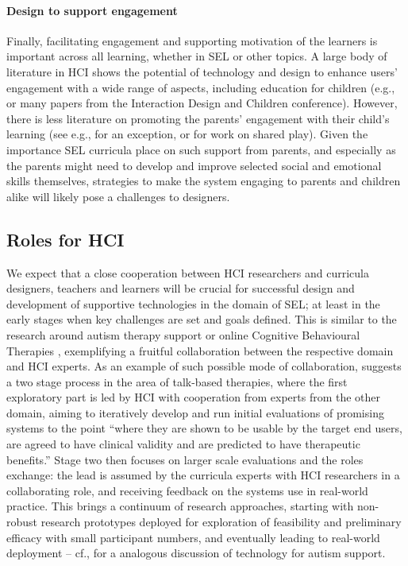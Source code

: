 \documentclass[prodmode,acmtochi]{acmsmall}
\begin{document}
\paragraph{Design to support engagement} Finally, facilitating engagement and supporting motivation of the learners is important across all learning, whether in SEL or other topics. A large body of literature in HCI shows the potential of technology and design to enhance users' engagement with a wide range of aspects, including education for children (e.g., \cite{Connolly2012,Bers2010} or many papers from the Interaction Design and Children conference). However, there is less literature on promoting the parents' engagement with their child's learning (see e.g., \cite{Lewin2010} for an exception, or \cite{Raffle2010} for work on shared play). Given the importance SEL curricula place on such support from parents, and especially as the parents might need to develop and improve selected social and emotional skills themselves, strategies to make the system engaging to parents and children alike will likely pose a challenges to designers.



\subsection*{Roles for HCI}


We expect that a close cooperation between HCI researchers and curricula designers, teachers and learners will be crucial for successful design and development of supportive technologies in the domain of SEL; at least in the early stages when key challenges are set and goals defined. This is similar to the research around autism therapy support \cite{Kientz2013} or online Cognitive Behavioural Therapies \cite{Bendall2014,Porayska-Pomsta2011}, exemplifying a fruitful collaboration between the respective domain and HCI experts.
%
As an example of such possible mode of collaboration,  suggests a two stage process in the area of talk-based therapies, where the first exploratory part is led by HCI with cooperation from experts from the other domain, aiming to iteratively develop and run initial evaluations of promising systems to the point ``where they are shown to be usable by the target end users, are agreed to have clinical validity and are predicted to have therapeutic benefits.'' Stage two then focuses on larger scale evaluations and the roles exchange: the lead is assumed by the curricula experts with HCI researchers in a collaborating role, and receiving feedback on the systems use in real-world practice. 
%
This brings a continuum of research approaches, starting with non-robust research prototypes deployed for exploration of feasibility and preliminary efficacy with small participant numbers, and eventually leading to real-world deployment -- cf., \cite[p.105-1-06]{Kientz2013} for a analogous discussion of technology for autism support.
\end{document}
